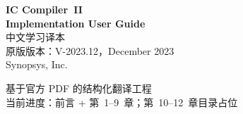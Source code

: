 \documentclass[UTF8,a4paper,openany,oneside]{ctexbook}
\begin{document}
\begin{titlepage}
  \centering
  \vspace*{2cm}
  {\Huge\bfseries IC Compiler\texttrademark\ II}\\[0.6em]
  {\Huge\bfseries Implementation User Guide}\\[1.2em]
  {\LARGE 中文学习译本}\\[2em]
  {\large 原版版本：V-2023.12，December 2023}\\[0.5em]
  {\large Synopsys, Inc.}\\[3em]
  \begin{minipage}{0.85\textwidth}
    \copyrightnotice
  \end{minipage}
  \vfill
  {\large 基于官方 PDF 的结构化翻译工程}\\[0.3em]
  {\normalsize 当前进度：前言 + 第~1--9~章；第~10--12~章目录占位}
\end{titlepage}

\frontmatter
\tableofcontents
\clearpage


\mainmatter












\end{document}
